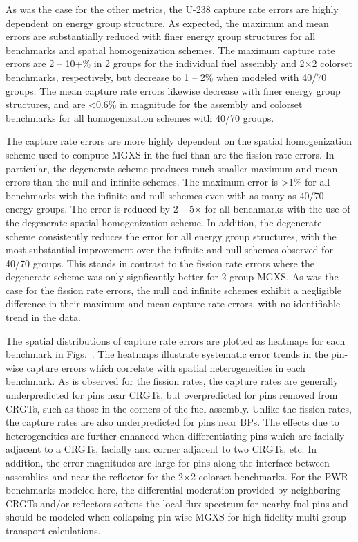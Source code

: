 As was the case for the other metrics, the U-238 capture rate errors are highly dependent on energy group structure. As expected, the maximum and mean errors are substantially reduced with finer energy group structures for all benchmarks and spatial homogenization schemes. The maximum capture rate errors are 2 -- 10+\% in 2 groups for the individual fuel assembly and 2$\times$2 colorset benchmarks, respectively, but decrease to 1 -- 2\% when modeled with 40/70 groups. The mean capture rate errors likewise decrease with finer energy group structures, and are <0.6\% in magnitude for the assembly and colorset benchmarks for all homogenization schemes with 40/70 groups.

The capture rate errors are more highly dependent on the spatial homogenization scheme used to compute \ac{MGXS} in the fuel than are the fission rate errors. In particular, the degenerate scheme produces much smaller maximum and mean errors than the null and infinite schemes. The maximum error is >1\% for all benchmarks with the infinite and null schemes even with as many as 40/70 energy groups. The error is reduced by 2 -- 5$\times$ for all benchmarks with the use of the degenerate spatial homogenization scheme. In addition, the degenerate scheme consistently reduces the error for all energy group structures, with the most substantial improvement over the infinite and null schemes observed for 40/70 groups. This stands in contrast to the fission rate errors where the degenerate scheme was only signficantly better for 2 group \ac{MGXS}. As was the case for the fission rate errors, the null and infinite schemes exhibit a negligible difference in their maximum and mean capture rate errors, with no identifiable trend in the data.

The spatial distributions of capture rate errors are plotted as heatmaps for each benchmark in Figs.~. The heatmaps illustrate systematic error trends in the pin-wise capture errors which correlate with spatial heterogeneities in each benchmark. As is observed for the fission rates, the capture rates are generally underpredicted for pins near \acp{CRGT}, but overpredicted for pins removed from \acp{CRGT}, such as those in the corners of the fuel assembly. Unlike the fission rates, the capture rates are also underpredicted for pins near \acp{BP}. The effects due to heterogeneities are further enhanced when differentiating pins which are facially adjacent to a \acp{CRGT}, facially and corner adjacent to two \acp{CRGT}, etc. In addition, the error magnitudes are large for pins along the interface between assemblies and near the reflector for the 2$\times$2 colorset benchmarks. For the \ac{PWR} benchmarks modeled here, the differential moderation provided by neighboring \acp{CRGT} and/or reflectors softens the local flux spectrum for nearby fuel pins and should be modeled when collapsing pin-wise \ac{MGXS} for high-fidelity multi-group transport calculations.

